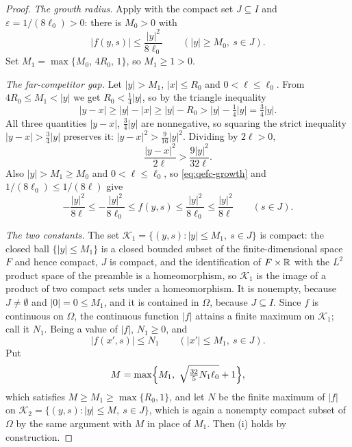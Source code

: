 \begin{proof}
\emph{The growth radius.}
Apply  with the compact set $J\subseteq I$ and
$\varepsilon=1/(8\ell_0)>0$: there is $M_0>0$ with
\begin{equation}\label{eq:qefc-growth}
  |f(y,s)|\le\frac{|y|^2}{8\ell_0}\qquad(|y|\ge M_0,\ s\in J).
\end{equation}
Set $M_1=\max\{M_0,\,4R_0,\,1\}$, so $M_1\ge1>0$.

\emph{The far-competitor gap.}
Let $|y|>M_1$, $|x|\le R_0$ and $0<\ell\le\ell_0$. From $4R_0\le M_1<|y|$ we get
$R_0<\tfrac14|y|$, so by the triangle inequality
\[
  |y-x|\ge|y|-|x|\ge|y|-R_0>|y|-\tfrac14|y|=\tfrac34|y| .
\]
All three quantities $|y-x|$, $\tfrac34|y|$ are nonnegative, so squaring the
strict inequality $|y-x|>\tfrac34|y|$ preserves it: $|y-x|^2>\tfrac9{16}|y|^2$.
Dividing by $2\ell>0$,
\begin{equation}\label{eq:qefc-cost}
  \frac{|y-x|^2}{2\ell}>\frac{9|y|^2}{32\ell}.
\end{equation}
Also $|y|>M_1\ge M_0$ and $0<\ell\le\ell_0$, so \eqref{eq:qefc-growth} and
$1/(8\ell_0)\le1/(8\ell)$ give
\begin{equation}\label{eq:qefc-fbound}
  -\frac{|y|^2}{8\ell}\le-\frac{|y|^2}{8\ell_0}\le f(y,s)\le\frac{|y|^2}{8\ell_0}
  \le\frac{|y|^2}{8\ell}\qquad(s\in J).
\end{equation}

\emph{The two constants.}
The set $\mathcal K_1=\{(y,s):|y|\le M_1,\ s\in J\}$ is compact: the closed ball
$\{|y|\le M_1\}$ is a closed bounded subset of the finite-dimensional space $F$
and hence compact, $J$ is compact, and the identification of $F\times\mathbb{R}$ with the
$L^2$ product space of the preamble is a homeomorphism, so $\mathcal K_1$ is the
image of a product of two compact sets under a homeomorphism. It is nonempty,
because $J\ne\emptyset$ and $|0|=0\le M_1$, and it is contained in $\Omega$,
because $J\subseteq I$. Since $f$ is continuous on $\Omega$, the continuous
function $|f|$ attains a finite maximum on $\mathcal K_1$; call it $N_1$. Being a
value of $|f|$, $N_1\ge0$, and
\begin{equation}\label{eq:qefc-N1}
  |f(x',s)|\le N_1\qquad(|x'|\le M_1,\ s\in J).
\end{equation}
Put
\[
  M=\max\Bigl\{M_1,\ \sqrt{\tfrac{32}{5}N_1\ell_0}+1\Bigr\},
\]
which satisfies $M\ge M_1\ge\max\{R_0,1\}$, and let $N$ be the finite maximum of
$|f|$ on $\mathcal K_2=\{(y,s):|y|\le M,\ s\in J\}$, which is again a nonempty
compact subset of $\Omega$ by the same argument with $M$ in place of $M_1$. Then
(i) holds by construction.


\end{proof}
